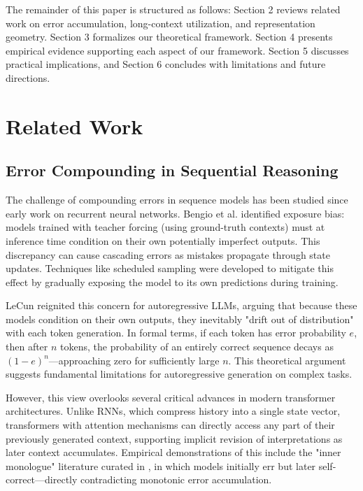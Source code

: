 \documentclass{article}
\begin{document}
The remainder of this paper is structured as follows: Section 2 reviews related work on error accumulation, long-context utilization, and representation geometry. Section 3 formalizes our theoretical framework. Section 4 presents empirical evidence supporting each aspect of our framework. Section 5 discusses practical implications, and Section 6 concludes with limitations and future directions.

\section{Related Work}

\subsection{Error Compounding in Sequential Reasoning}

The challenge of compounding errors in sequence models has been studied since early work on recurrent neural networks. Bengio et al. \citep{bengio2015scheduled} identified exposure bias: models trained with teacher forcing (using ground-truth contexts) must at inference time condition on their own potentially imperfect outputs. This discrepancy can cause cascading errors as mistakes propagate through state updates. Techniques like scheduled sampling were developed to mitigate this effect by gradually exposing the model to its own predictions during training.

LeCun \citep{lecun2023why} reignited this concern for autoregressive LLMs, arguing that because these models condition on their own outputs, they inevitably "drift out of distribution" with each token generation. In formal terms, if each token has error probability $e$, then after $n$ tokens, the probability of an entirely correct sequence decays as $(1-e)^n$—approaching zero for sufficiently large $n$. This theoretical argument suggests fundamental limitations for autoregressive generation on complex tasks.

However, this view overlooks several critical advances in modern transformer architectures. Unlike RNNs, which compress history into a single state vector, transformers with attention mechanisms can directly access any part of their previously generated context, supporting implicit revision of interpretations as later context accumulates. Empirical demonstrations of this include the "inner monologue" literature curated in \citet{gwern2023inner}, in which models initially err but later self-correct---directly contradicting monotonic error accumulation.
\end{document}
